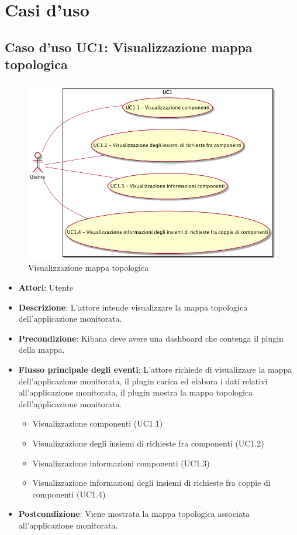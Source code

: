 \section{Casi d'uso}
\subsection{Caso d'uso UC1: Visualizzazione mappa topologica}
\begin{figure} [H]
\centering
\includegraphics[scale=0.45]{./UC/UC1.png}
\caption{Visualizzazione mappa topologica}\label{}
\end{figure}
\begin{itemize}
\item \textbf{Attori}: Utente
\item \textbf{Descrizione}: L'attore intende visualizzare la mappa topologica dell'applicazione monitorata.
\item \textbf{Precondizione}: Kibana deve avere una dashboard che contenga il plugin della mappa.
\item \textbf{Flusso principale degli eventi}: L'attore richiede di visualizzare la mappa dell'applicazione monitorata, il plugin carica ed elabora i dati relativi all'applicazione monitorata, il plugin mostra la mappa topologica dell'applicazione monitorata.
\begin{itemize}
\item Visualizzazione componenti (UC1.1)
\item Visualizzazione degli insiemi di richieste fra componenti (UC1.2)
\item Visualizzazione informazioni componenti (UC1.3)
\item Visualizzazione informazioni degli insiemi di richieste fra coppie di componenti (UC1.4)
\end{itemize}
\item \textbf{Postcondizione}: Viene mostrata la mappa topologica associata all'applicazione monitorata.
\end{itemize}
